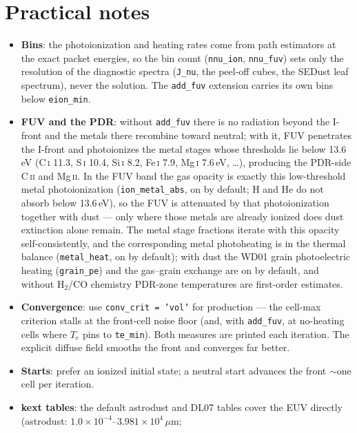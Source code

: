 \documentclass[english,a4paper]{my_memo}
\newcommand{\code}[1]{\texttt{#1}}
\begin{document}
\section{Practical notes}
\begin{itemize}
\item \textbf{Bins}: the photoionization and heating rates come from
  path estimators at the exact packet energies, so the bin count
  (\code{nnu\_ion}, \code{nnu\_fuv}) sets only the resolution of the
  diagnostic spectra (\code{J\_nu}, the peel-off cubes, the SEDust leaf
  spectrum), never the solution.  The \code{add\_fuv} extension carries its
  own bins below \code{eion\_min}.
\item \textbf{FUV and the PDR}: without \code{add\_fuv} there is no
  radiation beyond the I-front and the metals there recombine toward
  neutral; with it, FUV penetrates the I-front and photoionizes the metal
  stages whose thresholds lie below 13.6\,eV (C\,\textsc{i} 11.3, S\,\textsc{i}
  10.4, Si\,\textsc{i} 8.2, Fe\,\textsc{i} 7.9, Mg\,\textsc{i} 7.6\,eV,
  \ldots), producing the PDR-side C\,\textsc{ii} and Mg\,\textsc{ii}.  In the
  FUV band the gas opacity is exactly this low-threshold metal
  photoionization (\code{ion\_metal\_abs}, on by default; H and He do not
  absorb below 13.6\,eV), so the FUV is attenuated by that photoionization
  together with dust --- only where those metals are already ionized does
  dust extinction alone remain.  The metal stage fractions iterate with this
  opacity self-consistently, and the corresponding metal photoheating is in
  the thermal balance (\code{metal\_heat}, on by default); with dust the
  WD01 grain photoelectric heating (\code{grain\_pe}) and the gas--grain
  exchange are on by default, and without H$_2$/CO chemistry PDR-zone
  temperatures are first-order estimates.
\item \textbf{Convergence}: use \code{conv\_crit = 'vol'} for
  production --- the cell-max criterion stalls at the front-cell noise
  floor (and, with \code{add\_fuv}, at no-heating cells where $T_e$
  pins to \code{te\_min}).  Both measures are printed each iteration.
  The explicit diffuse field smooths the front and converges far better.
\item \textbf{Starts}: prefer an ionized initial state; a neutral start
  advances the front $\sim$one cell per iteration.
\item \textbf{kext tables}: the default astrodust and DL07 tables cover the
  EUV directly (astrodust: $1.0\times10^{-4}$--$3.981\times10^4\,\mu$m;

\end{itemize}
\end{document}
